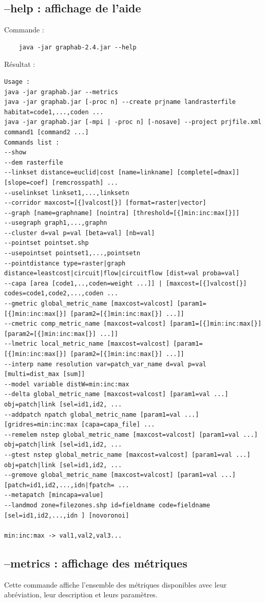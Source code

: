\documentclass[a4paper,10pt]{report}
\begin{document}
\subsection{--help : affichage de l'aide}
Commande :
\begin{Verbatim}
	java -jar graphab-2.4.jar --help
\end{Verbatim}
Résultat :
\begin{verbatim}
Usage :
java -jar graphab.jar --metrics
java -jar graphab.jar [-proc n] --create prjname landrasterfile habitat=code1,...,coden ...
java -jar graphab.jar [-mpi | -proc n] [-nosave] --project prjfile.xml command1 [command2 ...]
Commands list :
--show
--dem rasterfile
--linkset distance=euclid|cost [name=linkname] [complete[=dmax]] [slope=coef] [remcrosspath] ...
--uselinkset linkset1,...,linksetn
--corridor maxcost=[{]valcost[}] [format=raster|vector]
--graph [name=graphname] [nointra] [threshold=[{]min:inc:max[}]]
--usegraph graph1,...,graphn
--cluster d=val p=val [beta=val] [nb=val]
--pointset pointset.shp
--usepointset pointset1,...,pointsetn
--pointdistance type=raster|graph distance=leastcost|circuit|flow|circuitflow [dist=val proba=val]
--capa [area [code1,..,coden=weight ...]] | [maxcost=[{]valcost[}] codes=code1,code2,...,coden ...
--gmetric global_metric_name [maxcost=valcost] [param1=[{]min:inc:max[}] [param2=[{]min:inc:max[}] ...]]
--cmetric comp_metric_name [maxcost=valcost] [param1=[{]min:inc:max[}] [param2=[{]min:inc:max[}] ...]]
--lmetric local_metric_name [maxcost=valcost] [param1=[{]min:inc:max[}] [param2=[{]min:inc:max[}] ...]]
--interp name resolution var=patch_var_name d=val p=val [multi=dist_max [sum]]
--model variable distW=min:inc:max
--delta global_metric_name [maxcost=valcost] [param1=val ...] obj=patch|link [sel=id1,id2, ...
--addpatch npatch global_metric_name [param1=val ...] [gridres=min:inc:max [capa=capa_file] ...
--remelem nstep global_metric_name [maxcost=valcost] [param1=val ...] obj=patch|link [sel=id1,id2, ...
--gtest nstep global_metric_name [maxcost=valcost] [param1=val ...] obj=patch|link [sel=id1,id2, ...
--gremove global_metric_name [maxcost=valcost] [param1=val ...] [patch=id1,id2,...,idn|fpatch= ...
--metapatch [mincapa=value]
--landmod zone=filezones.shp id=fieldname code=fieldname [sel=id1,id2,...,idn ] [novoronoi]

min:inc:max -> val1,val2,val3...
\end{verbatim}

\subsection{--metrics : affichage des métriques}
Cette commande affiche l'ensemble des métriques disponibles avec leur abréviation, leur description et leurs paramètres.
\end{document}
